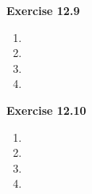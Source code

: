 \textbf{Exercise 12.9}
\begin{enumerate}
    \item 
    \item 
    \item 
    \item 
\end{enumerate}

\textbf{Exercise 12.10}
\begin{enumerate}
    \item 
    \item 
    \item 
    \item 
\end{enumerate}


